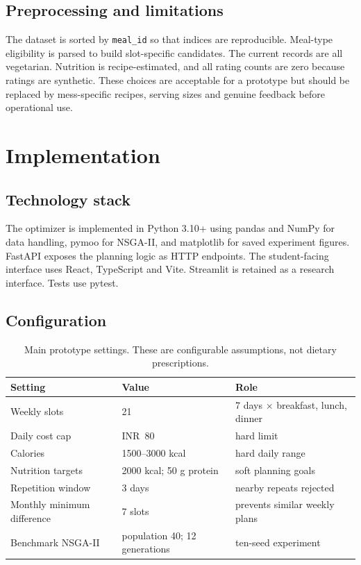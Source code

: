 \documentclass[12pt,a4paper]{report}
\begin{document}
\section{Preprocessing and limitations}
The dataset is sorted by \texttt{meal\_id} so that indices are reproducible. Meal-type eligibility is parsed to build slot-specific candidates. The current records are all vegetarian. Nutrition is recipe-estimated, and all rating counts are zero because ratings are synthetic. These choices are acceptable for a prototype but should be replaced by mess-specific recipes, serving sizes and genuine feedback before operational use.

\chapter{Implementation}
\section{Technology stack}
The optimizer is implemented in Python 3.10+ using pandas and NumPy for data handling, pymoo for NSGA-II, and matplotlib for saved experiment figures. FastAPI exposes the planning logic as HTTP endpoints. The student-facing interface uses React, TypeScript and Vite. Streamlit is retained as a research interface. Tests use pytest.

\section{Configuration}
\begin{table}[H]
\centering
\caption{Main prototype settings. These are configurable assumptions, not dietary prescriptions.}
\begin{tabular}{lll}
\toprule
\textbf{Setting} & \textbf{Value} & \textbf{Role}\\ \midrule
Weekly slots & 21 & 7 days $\times$ breakfast, lunch, dinner\\
Daily cost cap & INR~80 & hard limit\\
Calories & 1500--3000 kcal & hard daily range\\
Nutrition targets & 2000 kcal; 50 g protein & soft planning goals\\
Repetition window & 3 days & nearby repeats rejected\\
Monthly minimum difference & 7 slots & prevents similar weekly plans\\
Benchmark NSGA-II & population 40; 12 generations & ten-seed experiment\\
\bottomrule
\end{tabular}
\end{table}
\end{document}
